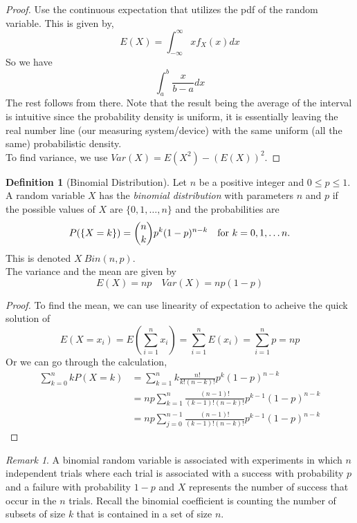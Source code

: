 \documentclass{article}
\theoremstyle{definition}
\newtheorem{definition}{Definition}[section]
\theoremstyle{remark}
\newtheorem{remark}{Remark}[section]
\begin{document}
\begin{proof}
Use the continuous expectation that utilizes the pdf
of the random variable. This is given by, 
\[
E(X) = \int_{-\infty}^{\infty} x f_X(x) dx
\]
So we have 
\[
\int_{a}^{b}\frac{x}{b-a} dx 
\]
The rest follows from there. Note that the result being the average of the interval is intuitive since 
the probability density is uniform, it is essentially leaving the real number line (our measuring system/device) 
with the same uniform (all the same) probabilistic density.\\
To find variance, we use $Var(X) = E(X^2) - (E(X))^2$.
\end{proof}


\vspace{.5cm}


\begin{definition}[Binomial Distribution]
Let $n$ be a positive integer and $ 0 \leq p \leq 1$. A random variable $X$ has the \textit{binomial distribution} with parameters
$n$ and $p$ if the possible values of $X$ are $\{0,1,\dots,n\}$ and the probabilities are 
\[
P(\{X=k\}) = \binom{n}{k}p^k(1-p)^{n-k} \quad \textnormal{for } k = 0,1,\dots n.
\]
This is denoted $X ~ Bin(n,p)$.\\
The variance and the mean are given by \[
E(X) = np \quad Var(X) = np(1-p)
\]

\end{definition}


\begin{proof}
To find the mean, we can use linearity of expectation to acheive the quick solution of 
\[
E(X = x_i) = E\left( \sum_{i=1}^{n} x_i \right)
 = \sum_{i=1}^{n} E(x_i) = \sum_{i=1}^{n} p = np 
\]
Or we can go through the calculation, 
\begin{align*}
    \sum^n_{k=0} k P(X=k) &= \sum_{k=1}^{n} k \frac{n!}{k!(n-k)!} p^k (1-p)^{n-k} \\
                          &= np \sum_{k=1}^{n} \frac{(n-1)!}{(k-1)!(n-k)!} p^{k-1} (1-p)^{n-k} \\
& = np \sum_{j=0}^{n-1} \frac{(n-1)!}{(k-1)!(n-k)!} p^{k-1} (1-p)^{n-k}
                        \end{align*} 
\end{proof}

\begin{remark}
A binomial random variable is associated with experiments in which $n$ 
independent trials where each trial is associated with a success with probability $p$ and a failure
with probability $1-p$ and $X$ represents the number of success that occur 
in the $n$ trials. Recall the binomial coefficient is counting the number of subsets 
of size $k$ that is contained in a set of size $n$.
\end{remark}
\end{document}
